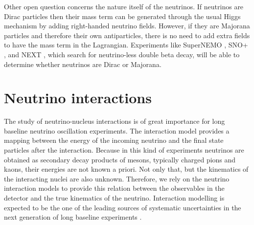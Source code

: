 Other open question concerns the nature itself of the neutrinos. If neutrinos are Dirac particles then their mass term can be generated through the usual Higgs mechanism by adding right-handed neutrino fields. However, if they are Majorana particles and therefore their own antiparticles, there is no need to add extra fields to have the mass term in the Lagrangian. Experiments like SuperNEMO \cite{SuperNEMO2010}, SNO+ \cite{SNO2015}, and NEXT \cite{NEXT2020}, which search for neutrino-less double beta decay, will be able to determine whether neutrinos are Dirac or Majorana.

\section{Neutrino interactions}\label{sec:nu_interactions}

The study of neutrino-nucleus interactions is of great importance for long baseline neutrino oscillation experiments. The interaction model provides a mapping between the energy of the incoming neutrino and the final state particles after the interaction. Because in this kind of experiments neutrinos are obtained as secondary decay products of mesons, typically charged pions and kaons, their energies are not known a priori. Not only that, but the kinematics of the interacting nuclei are also unknown. Therefore, we rely on the neutrino interaction models to provide this relation between the observables in the detector and the true kinematics of the neutrino. Interaction modelling is expected to be the one of the leading sources of systematic uncertainties in the next generation of long baseline experiments \cite{Coloma2013,Coloma2013a,Mosel2016}.

